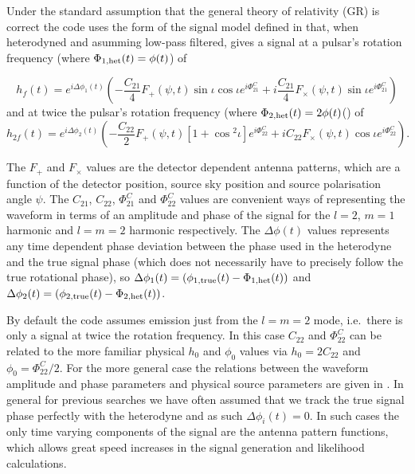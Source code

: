 Under the standard assumption that the general theory of relativity (GR) is correct the code uses the form of
the signal model defined in \citet{2015arXiv150105832J} that, when heterodyned and asumming low-pass
filtered, gives a signal at a pulsar's rotation frequency (where $\Phi_{1,{\rm het}}(t) = \phi(t)$) of
\begin{widetext}
\begin{equation}\label{eq:hf}
h_f(t) =  e^{i\Delta\phi_1(t)}\left(-\frac{C_{21}}{4}F_{+}(\psi,t)\sin{\iota}\cos{\iota}e^{i\Phi_{21}^C} +
i\frac{C_{21}}{4}F_{\times}(\psi,t)\sin{\iota}e^{i\Phi_{21}^C} \right)
\end{equation}
and at twice the pulsar's rotation frequency (where $\Phi_{2,{\rm het}}(t) = 2\phi(t)$() of
\begin{equation}\label{eq:h2f}
h_{2f}(t) =  e^{i\Delta\phi_2(t)}\left(-\frac{C_{22}}{2}F_{+}(\psi,t)[1+\cos{}^2\iota]e^{i\Phi_{22}^C} +
iC_{22}F_{\times}(\psi,t)\cos{\iota}e^{i\Phi_{22}^C} \right).
\end{equation}
\end{widetext}
The $F_{+}$ and $F_{\times}$ values are the detector dependent antenna patterns, which are a function of the
detector position, source sky position and source polarisation angle $\psi$. The $C_{21}$, $C_{22}$,
$\Phi_{21}^C$ and $\Phi_{22}^C$ values are convenient ways of representing the waveform in terms of an
amplitude and phase of the signal for the $l=2$, $m=1$ harmonic and $l=m=2$ harmonic respectively. The
$\Delta\phi(t)$ values represents any time dependent phase deviation between the phase used in the heterodyne
and the true signal phase (which does not necessarily have to precisely follow the true rotational phase), so
$\Delta\phi_1(t) = (\phi_{1,{\rm true}}(t)-\Phi_{1,{\rm het}}(t))$ and $\Delta\phi_2(t) = (\phi_{2,{\rm
true}}(t)-\Phi_{2,{\rm het}}(t))$.

By default the code assumes emission just from the $l=m=2$ mode, i.e.\ there is only a signal at twice the
rotation frequency. In this case $C_{22}$ and $\Phi_{22}^C$ can be related to the more familiar physical
$h_0$ and $\phi_0$ values via $h_0 = 2C_{22}$ and $\phi_0 = \Phi_{22}^C/2$. For the more general case the
relations between the waveform amplitude and phase parameters and physical source parameters are given in
\citet{2015arXiv150105832J}. In general for previous searches we have often assumed that we track the true
signal phase perfectly with the heterodyne and as such $\Delta\phi_i(t) = 0$. In such cases the only time
varying components of the signal are the antenna pattern functions, which allows great speed increases in the
signal generation and likelihood calculations.

